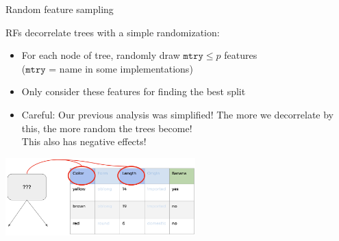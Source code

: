 \documentclass[11pt,compress,t,notes=noshow, xcolor=table]{beamer}
\begin{document}
\begin{vbframe}{Random feature sampling}

RFs decorrelate trees with a simple randomization:

\begin{itemize}
  \item For each node of tree, randomly draw $\texttt{mtry} \le p$ features \\
    ($\texttt{mtry}$ = name in some implementations)
  \item Only consider these features for finding the best split
  \item Careful: Our previous analysis was simplified! The more we decorrelate by this,
    the more random the trees become!
    \\This also has negative effects!
\end{itemize}

\begin{center}
\includegraphics[width=0.55\textwidth]{figure_man/forest-feature-sampling.png}
\end{center}



\end{vbframe}
\end{document}
